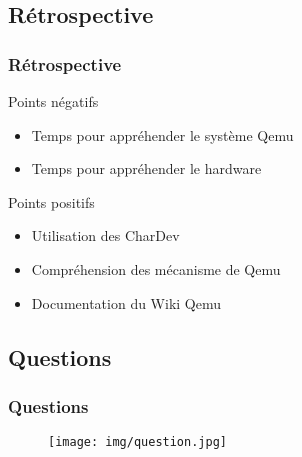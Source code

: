 \documentclass{beamer}
\begin{document}
		\subsection{Rétrospective}
			\begin{frame}
				\frametitle{Rétrospective}
				\begin{alertblock}{ Points négatifs }
					\begin{itemize}
						\item Temps pour appréhender le système Qemu
						\item Temps pour appréhender le hardware
					\end{itemize}
				\end{alertblock}
				\begin{exampleblock}{ Points positifs }
					\begin{itemize}
						\item Utilisation des CharDev
						\item Compréhension des mécanisme de Qemu
						\item Documentation du Wiki Qemu
					\end{itemize}
				\end{exampleblock}
			\end{frame}

		\subsection{Questions}
			\begin{frame}
				\frametitle{Questions}
				\begin{figure}
					\texttt{[image: img/question.jpg]}
				\end{figure}
			\end{frame}
			
			
\end{document}
